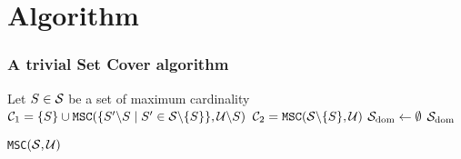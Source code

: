 \section{Algorithm}
\begin{frame}\frametitle{A trivial Set Cover algorithm}
\begin{algorithm}[H]\footnotesize
Let $S \in {\cal{S}}$ be a set of maximum cardinality\;
${\cal{C}}_1 = \{S\}\cup {\tt MSC}(\{S'\backslash S \mid S' \in{\cal S}\backslash \{S\}\}, {\cal U}\backslash S )$\;
${\cal{C}}_2 = {\tt MSC}({\cal S}\backslash \{S\},{\cal U})$\;
${\cal S}_{\rm dom} \leftarrow \emptyset$\;
\Return ${\cal S}_{\rm dom}$\;
\caption{{\tt MSC}$({\cal S,U})$}
\end{algorithm}
\end{frame}